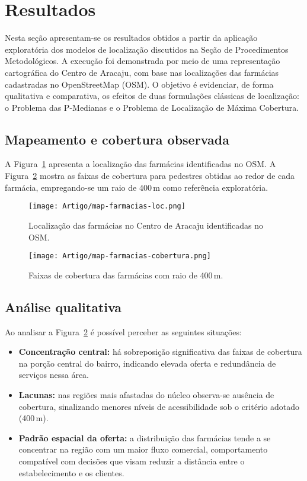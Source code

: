 \documentclass[12pt]{article}
\begin{document}
\section{Resultados}
\label{sec:resultados}

Nesta seção apresentam-se os resultados obtidos a partir da aplicação exploratória dos modelos de localização discutidos na Seção de Procedimentos Metodológicos. A execução foi demonstrada por meio de uma representação cartográfica do Centro de Aracaju, com base nas localizações das farmácias cadastradas no OpenStreetMap (OSM). O objetivo é evidenciar, de forma qualitativa e comparativa, os efeitos de duas formulações clássicas de localização: o Problema das P-Medianas e o Problema de Localização de Máxima Cobertura.

\subsection{Mapeamento e cobertura observada}

A Figura~\ref{fig:loc-farmacias} apresenta a localização das farmácias identificadas no OSM. A Figura~\ref{fig:cobertura-farmacias} mostra as faixas de cobertura para pedestres obtidas ao redor de cada farmácia, empregando-se um raio de 400\,m como referência exploratória.

\begin{figure}[H]
    \centering
    \texttt{[image: Artigo/map-farmacias-loc.png]}
    \caption{Localização das farmácias no Centro de Aracaju identificadas no OSM.}
    \label{fig:loc-farmacias}
\end{figure}

\begin{figure}[H]
    \centering
    \texttt{[image: Artigo/map-farmacias-cobertura.png]}
    \caption{Faixas de cobertura das farmácias com raio de 400\,m.}
    \label{fig:cobertura-farmacias}
\end{figure}

\subsection{Análise qualitativa}

Ao analisar a Figura~\ref{fig:cobertura-farmacias} é possível perceber as seguintes situações:

\begin{itemize}
    \item \textbf{Concentração central:} há sobreposição significativa das faixas de cobertura na porção central do bairro, indicando elevada oferta e redundância de serviços nessa área.
    \item \textbf{Lacunas:} nas regiões mais afastadas do núcleo observa-se ausência de cobertura, sinalizando menores níveis de acessibilidade sob o critério adotado (400\,m).
    \item \textbf{Padrão espacial da oferta:} a distribuição das farmácias tende a se concentrar na região com um maior fluxo comercial, comportamento compatível com decisões que visam reduzir a distância entre o estabelecimento e os clientes.
\end{itemize}
\end{document}
